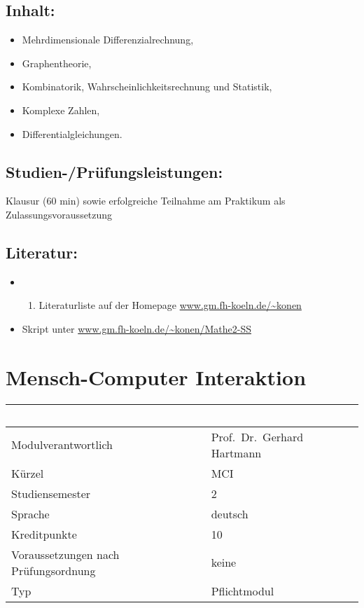 \section*{Inhalt:}\label{inhalt-14}

\begin{itemize}
\item
  Mehrdimensionale Differenzialrechnung,
\item
  Graphentheorie,
\item
  Kombinatorik, Wahrscheinlichkeitsrechnung und Statistik,
\item
  Komplexe Zahlen,
\item
  Differentialgleichungen.
\end{itemize}

\section*{Studien-/Prüfungsleistungen:}\label{studien-pruxfcfungsleistungen-12}

Klausur (60 min) sowie erfolgreiche Teilnahme am Praktikum als
Zulassungsvoraussetzung

\section*{Literatur:}\label{literatur-11}

\begin{itemize}
\item
  \begin{enumerate}
  \def\labelenumi{\alph{enumi}.}
  \setcounter{enumi}{18}
  \tightlist
  \item
    Literaturliste auf der Homepage \url{www.gm.fh-koeln.de/~konen}
  \end{enumerate}
\item
  Skript unter \url{www.gm.fh-koeln.de/~konen/Mathe2-SS}
\end{itemize}

\chapter{Mensch-Computer Interaktion}\label{mensch-computer-interaktion}

\begin{longtable}[]{@{}ll@{}}
\toprule
~ & ~\tabularnewline
\midrule
\endhead
Modulverantwortlich & Prof.~Dr.~Gerhard Hartmann\tabularnewline
Kürzel & MCI\tabularnewline
Studiensemester & 2\tabularnewline
Sprache & deutsch\tabularnewline
Kreditpunkte & 10\tabularnewline
Voraussetzungen nach Prüfungsordnung & keine\tabularnewline
Typ & Pflichtmodul\tabularnewline
\bottomrule
\end{longtable}

